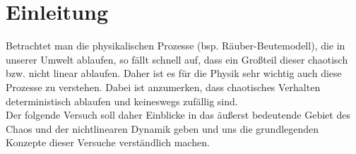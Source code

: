 

\chapter{Einleitung}
\label{chap:einleitung}

Betrachtet man die physikalischen Prozesse (bsp. Räuber-Beutemodell), die in unserer Umwelt ablaufen, so fällt schnell auf, dass ein Großteil dieser chaotisch bzw. nicht linear ablaufen. Daher ist es für die Physik sehr wichtig auch diese Prozesse zu verstehen. Dabei ist anzumerken, dass chaotisches Verhalten deterministisch ablaufen und keineswegs zufällig sind.\\
Der folgende Versuch soll daher Einblicke in das äußerst bedeutende Gebiet des Chaos und der nichtlinearen Dynamik geben und uns die grundlegenden Konzepte dieser Versuche verständlich machen.